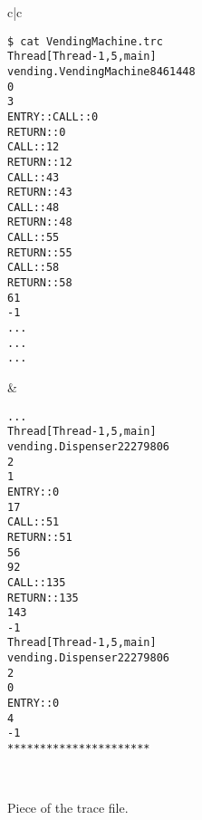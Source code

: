 
\begin{figure}[!ht]
\begin{center}\cmdsize
\begin{tabular}{c|c}
\begin{minipage}{2.5in}
\begin{verbatim}
$ cat VendingMachine.trc
Thread[Thread-1,5,main]
vending.VendingMachine8461448
0
3
ENTRY::CALL::0
RETURN::0
CALL::12
RETURN::12
CALL::43
RETURN::43
CALL::48
RETURN::48
CALL::55
RETURN::55
CALL::58
RETURN::58
61
-1
...
...
...
\end{verbatim}
\end{minipage}
&
\begin{minipage}{2.5in}
\begin{verbatim}
...
Thread[Thread-1,5,main]
vending.Dispenser22279806
2
1
ENTRY::0
17
CALL::51
RETURN::51
56
92
CALL::135
RETURN::135
143
-1
Thread[Thread-1,5,main]
vending.Dispenser22279806
2
0
ENTRY::0
4
-1
**********************
\end{verbatim}
\end{minipage}\\
\end{tabular}
\end{center}
\caption{Piece of the trace file.}\label{fig:trace-file}
\end{figure}

